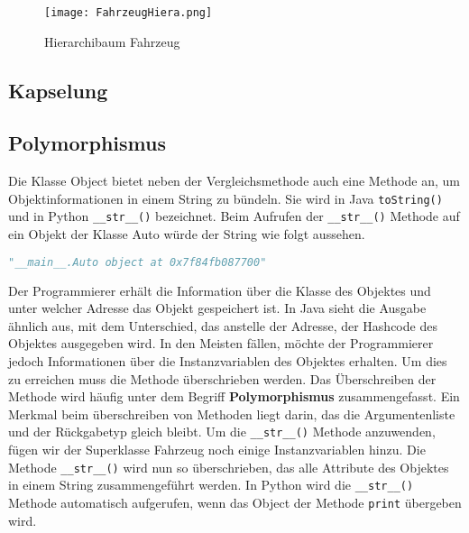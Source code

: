 \begin{figure}[!htb]
\centering
\texttt{[image: FahrzeugHiera.png]}%
\caption{Hierarchibaum Fahrzeug}
\label{img:Hierarchiebaum}
\end{figure}

\subsection{Kapselung} \label{subsec:Kapselung}


\subsection{Polymorphismus} \label{subsec:Polymorphismus}
Die Klasse Object bietet neben der Vergleichsmethode auch eine Methode an, um Objektinformationen in einem String zu bündeln. 
Sie wird in Java \texttt{toString()} und in Python \texttt{\_\_str\_\_()} bezeichnet. Beim Aufrufen der \texttt{\_\_str\_\_()} Methode auf ein Objekt der Klasse Auto würde der String wie folgt aussehen. 

\begin{lstlisting}[caption= \_\_str\_\_ Ausgabe Python, label=lst:strPython,language=Python]
 "__main__.Auto object at 0x7f84fb087700"   
\end{lstlisting}

Der Programmierer erhält die Information über die Klasse des Objektes und unter welcher Adresse das Objekt gespeichert ist. In Java sieht die Ausgabe ähnlich aus, mit dem Unterschied, das anstelle der Adresse, der Hashcode des Objektes ausgegeben wird. In den Meisten fällen, möchte der Programmierer jedoch Informationen über die Instanzvariablen des Objektes erhalten. Um dies zu erreichen muss die Methode überschrieben werden. Das Überschreiben der Methode wird häufig unter dem Begriff \textbf{Polymorphismus} zusammengefasst. Ein Merkmal beim überschreiben von Methoden liegt darin, das die Argumentenliste und der Rückgabetyp gleich bleibt. Um die \texttt{\_\_str\_\_()} Methode anzuwenden, fügen wir der Superklasse Fahrzeug noch einige Instanzvariablen hinzu. Die Methode \texttt{\_\_str\_\_()} wird nun so überschrieben, das alle Attribute des Objektes in einem String zusammengeführt werden. In Python wird die \texttt{\_\_str\_\_()} Methode automatisch aufgerufen, wenn das Object der Methode \texttt{print} übergeben wird. 

